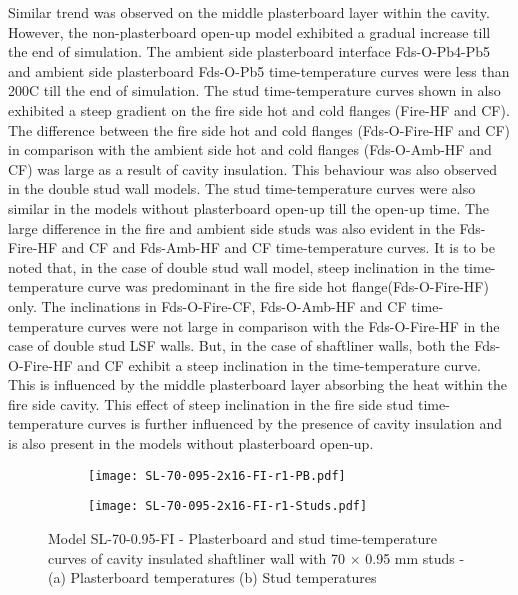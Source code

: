 Similar trend was observed on the middle plasterboard layer within the cavity. However, the non-plasterboard open-up model exhibited a gradual increase till the end of simulation. The ambient side plasterboard interface Fds-O-Pb4-Pb5 and ambient side plasterboard Fds-O-Pb5 time-temperature curves were less than 200\degree C till the end of simulation. The stud time-temperature curves shown in  also exhibited a steep gradient on the fire side hot and cold flanges (Fire-HF and CF). The difference between the fire side hot and cold flanges (Fds-O-Fire-HF and CF) in comparison with the ambient side hot and cold flanges (Fds-O-Amb-HF and CF) was large as a result of cavity insulation. This behaviour was also observed in the double stud wall models. The stud time-temperature curves were also similar in the models without plasterboard open-up till the open-up time. The large difference in the fire and ambient side studs was also evident in the Fds-Fire-HF and CF and Fds-Amb-HF and CF time-temperature curves. It is to be noted that, in the case of double stud wall model, steep inclination in the time-temperature curve was predominant in the fire side hot flange(Fds-O-Fire-HF) only. The inclinations in Fds-O-Fire-CF, Fds-O-Amb-HF and CF time-temperature curves were not large in comparison with the Fds-O-Fire-HF in the case of double stud LSF walls. But, in the case of shaftliner walls, both the Fds-O-Fire-HF and CF exhibit a steep inclination in the time-temperature curve. This is influenced by the middle plasterboard layer absorbing the heat within the fire side cavity. This effect of steep inclination in the fire side stud time-temperature curves is further influenced by the presence of cavity insulation and is also present in the models without plasterboard open-up. 
\begin{figure}[!htbp]
	\centering
	\begin{subfigure}[b]{0.6\textwidth}
		\centering
		\texttt{[image: SL-70-095-2x16-FI-r1-PB.pdf]}
		\caption{}
		\label{subfig:SL-70-095-2x16-FI-r1-PB}
	\end{subfigure}
\begin{subfigure}[b]{0.6\textwidth}
	\centering
	\texttt{[image: SL-70-095-2x16-FI-r1-Studs.pdf]}
	\caption{}
	\label{subfig:SL-70-095-2x16-FI-r1-Studs}
\end{subfigure}
   \caption{Model SL-70-0.95-FI - Plasterboard and stud time-temperature curves of cavity insulated shaftliner wall with 70 $\times$ 0.95 mm studs - (a) Plasterboard temperatures (b) Stud temperatures}
   \label{fig:SL-70-095-2x16-FI-r1}
\end{figure}

